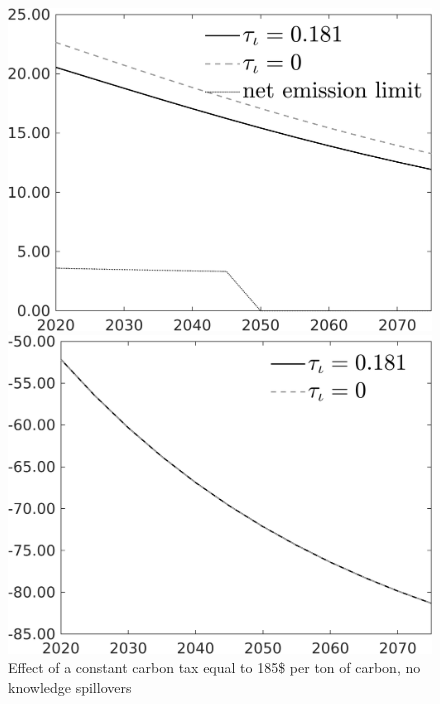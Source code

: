 \begin{figure}[h!!]
	\centering
	\caption{Effect of a constant carbon tax equal to 185\$ per ton of carbon, no knowledge spillovers }\label{fig:Leveltauf_nsk0_xgr0_noknow_equal}		
	\begin{minipage}[]{0.32\textwidth}
		\includegraphics[width=1\textwidth]{../../codding_model/own_basedOnFried/optimalPol_010922_revision/figures/all_13Sept22/CompTauf_bytaul_Equlab_Reg0_Emnet_spillover0_nsk0_xgr0_knspil1_sep0_LFlimit0_emsbase0_countec0_GovRev0_etaa0.79_lgd1.png}
	\end{minipage}	
	\begin{minipage}[]{0.32\textwidth}
		\includegraphics[width=1\textwidth]{../../codding_model/own_basedOnFried/optimalPol_010922_revision/figures/all_13Sept22/PerdifNoTauf_Equlab_regime0_CompTaul_F_spillover0_nsk0_xgr0_knspil1_sep0_LFlimit0_emsbase0_countec0_GovRev0_etaa0.79_lgd1.png}

\end{minipage}
\end{figure}
